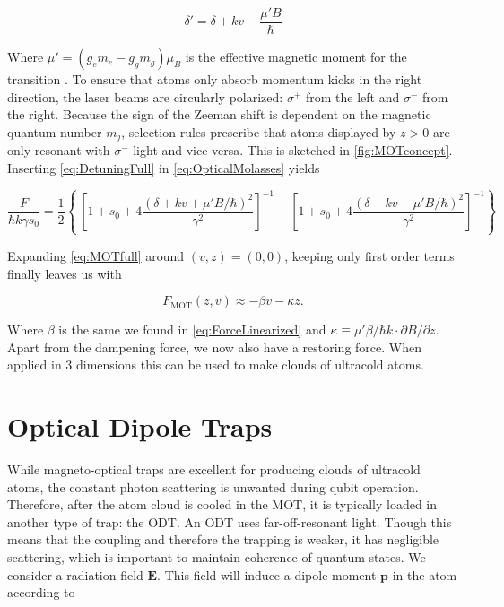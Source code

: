 \begin{equation}\label{eq:DetuningFull}
	\delta' = \delta + k v - \frac{\mu'B}{\hbar}
\end{equation}

Where $\mu' = (g_e m_e-g_g m_g)\mu_B$ is the effective magnetic moment for the transition \cite{Kowalski2010}. To ensure that atoms only absorb momentum kicks in the right direction, the laser beams are circularly polarized: $\sigma^+$ from the left and $\sigma^-$ from the right. Because the sign of the Zeeman shift is dependent on the magnetic quantum number $m_j$, selection rules prescribe that atoms displayed by $z>0$ are only resonant with $\sigma^-$-light and vice versa. This is sketched in \cref{fig:MOTconcept}. Inserting \cref{eq:DetuningFull} in \cref{eq:OpticalMolasses} yields

\begin{equation}\label{eq:MOTfull}
	\frac{F}{\hbar k \gamma s_0} = \frac{1}{2}\left\{\
	\left[1 + s_0 + 4\frac{(\delta+kv+\mu'B/\hbar)^2}{\gamma^2}\right]^{-1}+
	\left[1 + s_0 + 4\frac{(\delta-kv-\mu'B/\hbar)^2}{\gamma^2}\right]^{-1}
	\right\}
\end{equation}

Expanding \cref{eq:MOTfull} around $(v,z) = (0,0)$, keeping only first order terms finally leaves us with \cite{Kowalski2010}

\begin{equation}\label{eq:ForceMOT}
	F_{\text{MOT}}(z,v) \approx -\beta v - \kappa z.
\end{equation}

Where $\beta$ is the same we found in \cref{eq:ForceLinearized} and $\kappa \equiv \mu' \beta /\hbar k \cdot \partial B/\partial z$. Apart from the dampening force, we now also have a restoring force. When applied in 3 dimensions this can be used to make clouds of ultracold atoms. 

\section{Optical Dipole Traps}\label{sec:OpticalDipoleTrap}

While magneto-optical traps are excellent for producing clouds of ultracold atoms, the constant photon scattering is unwanted during qubit operation. Therefore, after the atom cloud is cooled in the \ac{MOT}, it is typically loaded in another type of trap: the \ac{ODT}. An ODT uses far-off-resonant light. Though this means that the coupling and therefore the trapping is weaker, it has negligible scattering, which is important to maintain coherence of quantum states. We consider a radiation field $\mathbf{E}$. This field will induce a dipole moment $\mathbf{p}$ in the atom according to 
	
